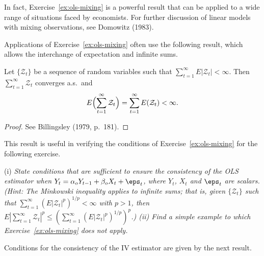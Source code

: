 In fact, Exercise~\ref{ex:ols-mixing} is a powerful result that can be applied to a wide range of situations faced by economists. For further discussion of linear models with mixing observations, see Domowitz (1983).

Applications of Exercise~\ref{ex:ols-mixing} often use the following result, which allows the interchange of expectation and infinite sums.

\begin{proposition}\label{prop:interchange-sum}
Let $\{\mathcal{Z}_t\}$ be a sequence of random variables such that $\sum_{t=1}^{\infty} E|\mathcal{Z}_t| < \infty$. Then $\sum_{t=1}^{\infty} \mathcal{Z}_t$ converges a.s.\ and
\[
E\Bigl(\sum_{t=1}^{\infty} \mathcal{Z}_t\Bigr) = \sum_{t=1}^{\infty} E(\mathcal{Z}_t) < \infty.
\]
\end{proposition}

\begin{proof}
See Billingsley (1979, p.~181). \qedhere
\end{proof}

This result is useful in verifying the conditions of Exercise~\ref{ex:ols-mixing} for the following exercise.

\begin{exercises}
\item\label{ex:ols-mixing-ar} (i) \emph{State conditions that are sufficient to ensure the consistency of the OLS estimator when $Y_t = \alpha_o Y_{t-1} + \beta_o X_t + \eps_t$, where $Y_t$, $X_t$ and $\eps_t$ are scalars. (Hint: The Minkowski inequality applies to infinite sums; that is, given $\{\mathcal{Z}_t\}$ such that $\sum_{t=1}^{\infty} (E|\mathcal{Z}_t|^p)^{1/p} < \infty$ with $p > 1$, then $E|\sum_{t=1}^{\infty} \mathcal{Z}_t|^p \leq (\sum_{t=1}^{\infty} (E|\mathcal{Z}_t|^p)^{1/p})^p$.) (ii) Find a simple example to which Exercise~\ref{ex:ols-mixing} does not apply.}
\end{exercises}

Conditions for the consistency of the IV estimator are given by the next result.

